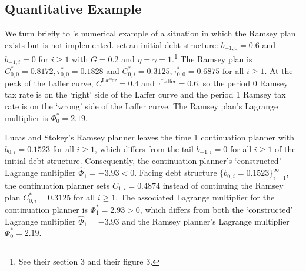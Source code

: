 \documentclass[12pt]{article}
\newcommand{\TS}[1]{{\textcolor{magenta}{#1}}}
\begin{document}
\subsection{Quantitative Example}\label{sec:DNYquantexample}
We turn briefly to
\citeauthor{debortoli2021optimal}'s numerical example of a situation in which the Ramsey plan exists but is not implemented. 
  \citet{debortoli2021optimal} set an initial debt  structure: $b_{-1, 0}=0.6$ and $b_{-1, i}=0$ for $i\geq 1$ with $G=0.2$ and $\eta=\gamma=1.$\footnote{See their section 3 and their figure 3.} %
The Ramsey plan is  $C_{0, 0}^* =0.8172, \tau_{0, 0}^* =0.1828$  and $C_{0, i}^*=0.3125, \tau_{0, 0}^* =0.6875$ for all $i\geq 1$. At the peak of the Laffer curve, $C^{\text{Laffer}}=0.4$ and $\tau^{\text{Laffer}}=0.6$, so the period 0   Ramsey tax rate  is  on the `right' side of the Laffer curve and the period 1 Ramsey  tax rate  is  on the `wrong' side of the Laffer curve. 
The Ramsey plan's  Lagrange multiplier  is $\Phi_0^\ast=2.19$. %


Lucas and Stokey's  Ramsey planner leaves the time 1 continuation planner  with $b_{0, i}=0.1523$  for all $i\geq 1$, which differs from the tail  $b_{-1, i}=0$ for all $i\geq 1$ of the initial debt structure. Consequently, the continuation planner's   `constructed' Lagrange multiplier  $\widehat{\Phi}_1=-3.93 < 0$. Facing debt structure $\{b_{0, i}=0.1523\}_{i=1}^\infty$,   the continuation planner sets  $C_{1, i}=0.4874$  instead of continuing the Ramsey plan $C_{0, i}^\ast=0.3125$  for all $i\geq 1$. {The associated Lagrange multiplier for   the continuation planner is ${\Phi}_1^\ast=2.93>0$, which 
differs  from  both the `constructed' Lagrange multiplier 
$\widehat{\Phi}_1=-3.93$ and the Ramsey planner's Lagrange multiplier $\Phi_0^\ast=2.19$.} 
\end{document}
